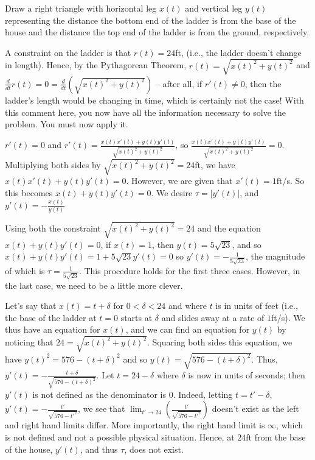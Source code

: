 \documentclass{ximera}
\begin{document}
\begin{exercise}
\begin{hint}
Draw a right triangle with horizontal leg $x(t)$ and vertical leg $y(t)$ representing the distance the bottom end of the ladder is from the base of the house and the distance the top end of the ladder is from the ground, respectively.
\end{hint}
\begin{hint}
A constraint on the ladder is that $r(t)=24$ft, (i.e., the ladder doesn't change in length). Hence, by the Pythagorean Theorem, $r(t)=\sqrt{x(t)^2+y(t)^2}$ and $\frac{d}{dt}r(t)=0=\frac{d}{dt}(\sqrt{x(t)^2+y(t)^2})$ -- after all, if $r'(t)\ne0$, then the ladder's length would be changing in time, which is certainly not the case! With this comment here, you now have all the information necessary to solve the problem. You must now apply it.
\end{hint}
\begin{hint}
$r'(t)=0$ and $r'(t)=\frac{x(t)x'(t)+y(t)y'(t)}{\sqrt{x(t)^2+y(t)^2}}$, so $\frac{x(t)x'(t)+y(t)y'(t)}{\sqrt{x(t)^2+y(t)^2}}=0$. Multiplying both sides by $\sqrt{x(t)^2+y(t)^2}=24$ft, we have  $x(t)x'(t)+y(t)y'(t)=0$. However, we are given that $x'(t)=1$ft/s. So this becomes $x(t)+y(t)y'(t)=0$. We desire $\tau=\left|y'(t)\right|$, and $y'(t)=-\frac{x(t)}{y(t)}$
\end{hint}
\begin{hint}
Using both the constraint $\sqrt{x(t)^2+y(t)^2}=24$ and the equation $x(t)+y(t)y'(t)=0$, if $x(t)=1$, then $y(t)=5\sqrt{23}$, and so $x(t)+y(t)y'(t)=1+5\sqrt{23}y'(t)=0$ so $y'(t)=-\frac{1}{5\sqrt{23}}$, the magnitude of which is $\tau=\frac{1}{5\sqrt{23}}$. This procedure holds for the first three cases. However, in the last case, we need to be a little more clever.
\end{hint}
\begin{hint}
Let's say that $x(t)=t+\delta$ for $0<\delta<24$ and where $t$ is in units of feet (i.e., the base of the ladder at $t=0$ starts at $\delta$ and slides away at a rate of $1$ft/s). We thus have an equation for $x(t)$, and we can find an equation for $y(t)$ by noticing that $24=\sqrt{x(t)^2+y(t)^2}$. Squaring both sides this equation, we have $y(t)^2=576-(t+\delta)^2$ and so $y(t)=\sqrt{576-(t+\delta)^2}$. Thus, $y'(t)=-\frac{t+\delta}{\sqrt{576-(t+\delta)^2}}$. Let $t=24-\delta$ where $\delta$ is now in units of seconds; then $y'(t)$ is not defined as the denominator is $0$. Indeed, letting $t=t'-\delta$, $y'(t)=-\frac{t'}{\sqrt{576-{t'}^2}}$, we see that $\lim_{t'\to24}(\frac{t'}{\sqrt{576-{t'}^2}})$ doesn't exist as the left and right hand limits differ. More importantly, the right hand limit is $\infty$, which is not defined and not a possible physical situation. Hence, at $24$ft from the base of the house, $y'(t)$, and thus $\tau$, does not exist.
\end{hint}
\end{exercise}
\end{document}
